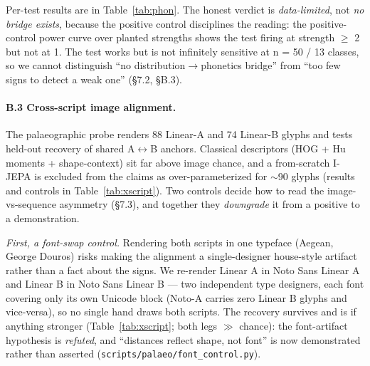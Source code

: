 Per-test results are in Table~\ref{tab:phon}. The honest verdict is
\emph{data-limited},
not \emph{no bridge exists}, because the positive control disciplines the
reading: the positive-control power curve over planted strengths shows
the test firing at strength $\ge$ 2 but not at 1. The test
works but is not infinitely sensitive at n = 50 / 13 classes, so we cannot
distinguish ``no distribution$\rightarrow$phonetics bridge'' from ``too few
signs to detect a weak one'' (\S7.2, \S B.3).

\paragraph{B.3 Cross-script image alignment.} The palaeographic probe
renders 88 Linear-A and 74 Linear-B glyphs and tests held-out recovery of
shared A$\leftrightarrow$B anchors. Classical descriptors (HOG + Hu moments
+ shape-context) sit far above image chance, and a from-scratch I-JEPA is
excluded from the claims as over-parameterized for $\sim$90 glyphs
(results and controls in Table~\ref{tab:xscript}). Two controls decide how
to read the image-vs-sequence asymmetry (\S7.3), and together they
\emph{downgrade} it from a positive to a demonstration.

\emph{First, a font-swap control.} Rendering both scripts in one typeface
(Aegean, George Douros) risks making the alignment a single-designer
house-style artifact rather than a fact about the signs. We re-render Linear
A in Noto Sans Linear A and Linear B in Noto Sans Linear B --- two
independent type designers, each font covering only its own Unicode block
(Noto-A carries zero Linear B glyphs and vice-versa), so no single hand
draws both scripts. The recovery survives and is if anything stronger
(Table~\ref{tab:xscript}; both legs $\gg$ chance): the font-artifact
hypothesis is \emph{refuted}, and ``distances reflect shape, not font'' is
now demonstrated rather than asserted
(\texttt{scripts/\allowbreak palaeo/\allowbreak font\_control.py}).

